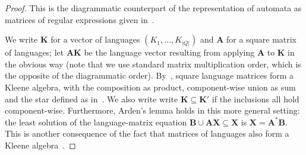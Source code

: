 \documentclass{lmcs}
\theoremstyle{plain}\newtheorem{satz}[thm]{Satz} %
\begin{document}
\begin{proof}
This is the diagrammatic counterpart of the representation of automata as matrices of regular expressions given in~\cite[Definition 12]{kozen1994completeness}.

We write $\mathbf{K}$ for a vector of languages $(K_1,\dots, K_{|Q|})$ and $\mathbf{A}$ for a square matrix of languages; let $\mathbf{A}\mathbf{K}$ be the language vector resulting from applying $\mathbf{A}$ to $\mathbf{K}$ in the obvious way (note that we use standard matrix multiplication order, which is the opposite of the diagrammatic order). By~\cite[Theorem 11]{kozen1994completeness}, square language matrices form a Kleene algebra, with the composition as product, component-wise union as sum and the star defined as in~\cite[Lemma 10]{kozen1994completeness}. We also write write $\mathbf{K}\subseteq \mathbf{K}'$ if the inclusions all hold component-wise. Furthermore, Arden's lemma holds in this more general setting: the least solution of the language-matrix equation $\mathbf{B}\cup \mathbf{A}\mathbf{X}\subseteq \mathbf{X}$ is $\mathbf{X} = \mathbf{A}^*\mathbf{B}$. This is another consequence of the fact that matrices of languages also form a Kleene algebra~\cite[Theorem 11]{kozen1994completeness}.


\end{proof}
\end{document}
